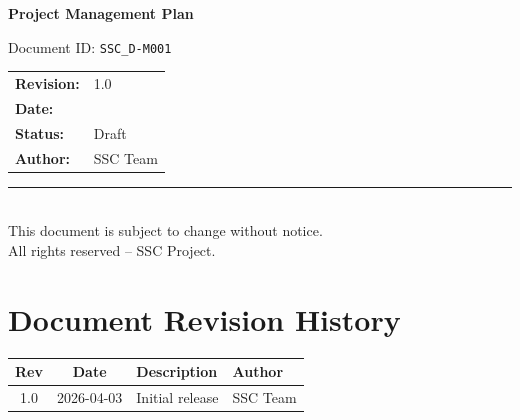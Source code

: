 \documentclass[12pt,a4paper]{article}
\newcommand{\docid}{SSC\_D-M001}
\newcommand{\doctitle}{Project Management Plan}
\newcommand{\docrev}{1.0}
\newcommand{\docdate}{\DTMdate{2026-04-03}}
\newcommand{\docstatus}{Draft}
\newcommand{\docauthor}{SSC Team}
\begin{document}

\begin{titlepage}
  \centering
  \vspace*{2cm}

  {\Huge\bfseries\color{sscblue} \doctitle \par}
  \vspace{0.5cm}
  {\large Document ID: \texttt{\docid} \par}
  \vspace{2cm}

  \begin{tabular}{ll}
    \textbf{Revision:} & \docrev \\[4pt]
    \textbf{Date:}     & \docdate \\[4pt]
    \textbf{Status:}   & \docstatus \\[4pt]
    \textbf{Author:}   & \docauthor \\
  \end{tabular}

  \vfill
  \rule{\linewidth}{0.4pt}\\[4pt]
  {\small This document is subject to change without notice.\\
  All rights reserved -- SSC Project.}
\end{titlepage}

\newpage
\section*{Document Revision History}
\begin{tabularx}{\textwidth}{|c|c|X|l|}
  \hline
  \rowcolor{lightgray}
  \textbf{Rev} & \textbf{Date} & \textbf{Description} & \textbf{Author} \\
  \hline
  1.0 & 2026-04-03 & Initial release & SSC Team \\
  \hline
\end{tabularx}

\newpage
\tableofcontents
\newpage

\end{document}
